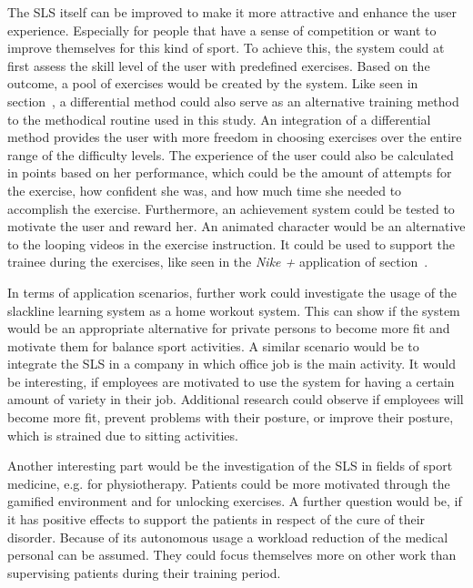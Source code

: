The SLS itself can be improved to make it more attractive and enhance the user experience.
Especially for people that have a sense of competition or want to improve themselves for this kind of sport. 
To achieve this, the system could at first assess the skill level of the user with predefined exercises.
Based on the outcome, a pool of exercises would be created by the system.
Like seen in section~\textit{}, a differential method could also serve as an alternative training method to the methodical routine used in this study.
An integration of a differential method provides the user with more freedom in choosing exercises over the entire range of the difficulty levels.
The experience of the user could also be calculated in points based on her performance, which could be the amount of attempts for the exercise, how confident she was, and how much time she needed to accomplish the exercise.
Furthermore, an achievement system could be tested to motivate the user and reward her.
An animated character would be an alternative to the looping videos in the exercise instruction.
It could be used to support the trainee during the exercises, like seen in the \textit{Nike +} application of section~\textit{}.

In terms of application scenarios, further work could investigate the usage of the slackline learning system as a home workout system.
This can show if the system would be an appropriate alternative for private persons to become more fit and motivate them for balance sport activities.
A similar scenario would be to integrate the SLS in a company in which office job is the main activity.
It would be interesting, if employees are motivated to use the system for having a certain amount of variety in their job.
Additional research could observe if employees will become more fit, prevent problems with their posture, or improve their posture, which is strained due to sitting activities.

Another interesting part would be the investigation of the SLS in fields of sport medicine, e.g. for physiotherapy.
Patients could be more motivated through the gamified environment and for unlocking exercises.
A further question would be, if it has positive effects to support the patients in respect of the cure of their disorder.
Because of its autonomous usage a workload reduction of the medical personal can be assumed.
They could focus themselves more on other work than supervising patients during their training period.

